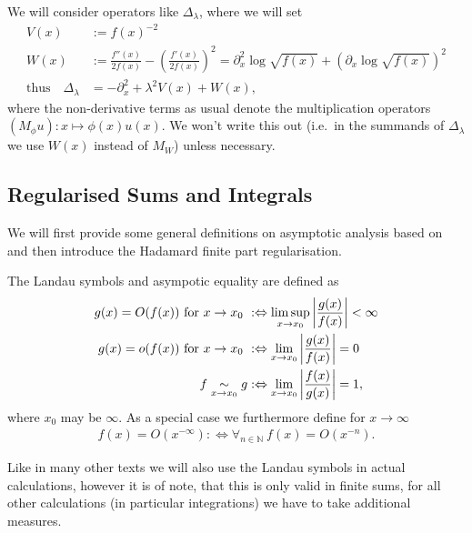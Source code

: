 We will consider operators like $\Delta_\lambda$, where we will set
\begin{align}
  V(x) &:= f(x)^{-2} \\
  W(x) &:= \frac{f''(x)}{2f(x)} - \left(\frac{f'(x)}{2f(x)}\right)^2 =
  \partial_x^2 \log\sqrt{f(x)} + \left(\partial_x \log\sqrt{f(x)}\right)^2 \\
  \text{thus}\quad \Delta_\lambda &= -\partial^2_x + \lambda^2 V(x) + W(x),
\end{align}
where the non-derivative terms as usual denote the multiplication operators
$(M_\phi u)\colon x \mapsto \phi(x)u(x)$. We won't write this out (i.e.\ in the
summands of $\Delta_\lambda$ we use $W(x)$ instead of $M_W$) unless necessary.

\subsection{Regularised Sums and Integrals}
\label{sec:regsum-int}
We will first provide some general definitions on asymptotic analysis based on
\cite[Ch.1]{Miller2006} and then introduce the Hadamard finite part regularisation.

\begin{Definition}
  The Landau symbols and asympotic equality are defined as
  \begin{align}
    g(x) = O(f(x))\text{ for $x\to x_0$ } &:\Leftrightarrow \limsup_{x\to x_0}
    \left|\frac{g(x)}{f(x)}\right| < \infty \\
    g(x) = o(f(x))\text{ for $x\to x_0$ } &:\Leftrightarrow \lim_{x\to
    x_0}\left|\frac{g(x)}{f(x)}\right| = 0 \\
    f \mathrel{\underset{x\to x_0}{\sim}} g &:\Leftrightarrow \lim_{x\to x_0}
    \left|\frac{f(x)}{g(x)}\right| = 1,
  \end{align}
  where $x_0$ may be $\infty$. As a special case we furthermore define for
  $x\to\infty$
  \begin{align}
    f(x) = O(x^{-\infty}) :\Leftrightarrow \forall_{n\in\mathbb{N}}\ f(x) =
    O(x^{-n}).
  \end{align}
\end{Definition}
Like in many other texts we will also use the Landau symbols in actual
calculations, however it is of note, that this is only valid in finite sums, for
all other calculations (in particular integrations) we have to take additional
measures.

